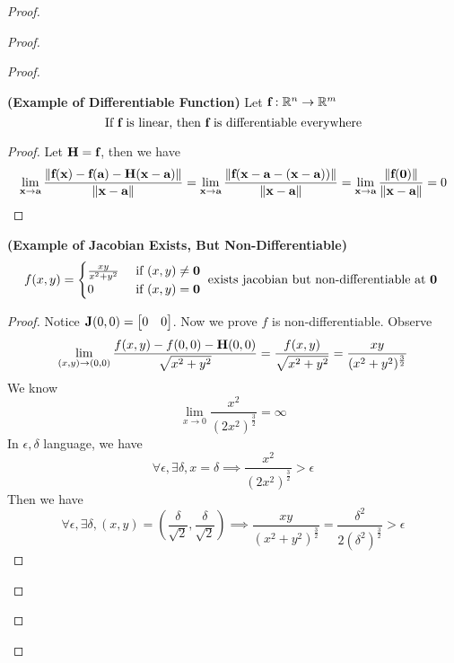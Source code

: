 \documentclass{report}
\begin{document}
\begin{proof}
\begin{proof}
\begin{proof}
\begin{theorem}
\label{6.3.2}
\textbf{(Example of Differentiable Function)} Let $\textbf{f}:\mathbb{R}^n\rightarrow \mathbb{R}^m$ 
\begin{equation}
\text{ If $\textbf{f}$ is linear, then $\textbf{f}$ is differentiable everywhere }
\end{equation}
\end{theorem}
\begin{proof}
Let $\textbf{H}=\textbf{f}$, then we have 
\begin{equation}
  \lim_{\textbf{x}\to \textbf{a}}\frac{\| \textbf{f}(\textbf{x})-\textbf{f}(\textbf{a})-\textbf{H}(\textbf{x}-\textbf{a}) \|}{\| \textbf{x}-\textbf{a} \|}=\lim_{\textbf{x}\to \textbf{a}}\frac{\| \textbf{f}(\textbf{x}-\textbf{a}-(\textbf{x}-\textbf{a})) \|}{\| \textbf{x}-\textbf{a} \|}=\lim_{\textbf{x}\to \textbf{a}}\frac{\| \textbf{f}(\textbf{0}) \|}{\| \textbf{x}-\textbf{a} \|}=0
\end{equation}
\end{proof}
\begin{theorem}
\label{6.3.3}
\textbf{(Example of Jacobian Exists, But Non-Differentiable)} 
\begin{equation}
f(x,y)=\begin{cases}
  \frac{xy}{x^2+y^2}& \text{ if  }(x,y)\neq \textbf{0}\\
  0& \text{ if  }(x,y)=\textbf{0}
\end{cases}\text{ exists jacobian but non-differentiable at $\textbf{0}$  }
\end{equation}
\end{theorem}
\begin{proof}
Notice $\textbf{J}(0,0)=\begin{bmatrix}
  0&0
\end{bmatrix}$. Now we prove $f$ is non-differentiable. Observe
\begin{equation}
\lim_{(x,y)\to (0,0)}\frac{f(x,y)-f(0,0)-\textbf{H}(0,0)}{\sqrt{x^2+y^2} }=\frac{f(x,y)}{\sqrt{x^2+y^2} }=\frac{xy}{(x^2+y^2)^{\frac{3}{2}}}
\end{equation}
We know 
\begin{equation}
\lim_{x\to 0}\frac{x^2}{(2x^2)^{\frac{3}{2}}}=\infty
\end{equation}
In $\epsilon,\delta$ language, we have
\begin{equation}
\forall \epsilon, \exists \delta, x=\delta\implies  \frac{x^2}{(2x^2)^{\frac{3}{2}}}>\epsilon 
\end{equation}
Then we have 
\begin{equation}
  \forall \epsilon ,\exists \delta, (x,y)=(\frac{\delta}{\sqrt{2}},\frac{\delta}{\sqrt{2}}) \implies \frac{xy}{(x^2+y^2)^{\frac{3}{2}}}=\frac{\delta^2}{2(\delta^2)^{\frac{3}{2}}}>\epsilon 

\end{equation}
\end{proof}
\end{proof}
\end{proof}
\end{proof}
\end{document}
